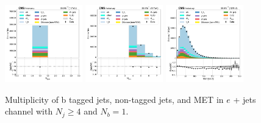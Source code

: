 \begin{figure}[htb!]
    \centering
    \includegraphics[width=0.3\textwidth]{chapters/Appendix/sectionPlots/figures/data_mc_overlays/ejet_2016_cat_gt4_eq1_signal_linear_jet_n_bjets}
    \includegraphics[width=0.3\textwidth]{chapters/Appendix/sectionPlots/figures/data_mc_overlays/ejet_2016_cat_gt4_eq1_signal_linear_jet_n_jets}
    \includegraphics[width=0.3\textwidth]{chapters/Appendix/sectionPlots/figures/data_mc_overlays/ejet_2016_cat_gt4_eq1_signal_linear_misc_met_mag}
    \caption{Multiplicity of b tagged jets, non-tagged jets, and MET in
    $e$ + jets channel with $N_{j} \geq 4$ and $N_{b} = 1$.
    \label{fig:ejet_1_jetmet}}
\end{figure}

